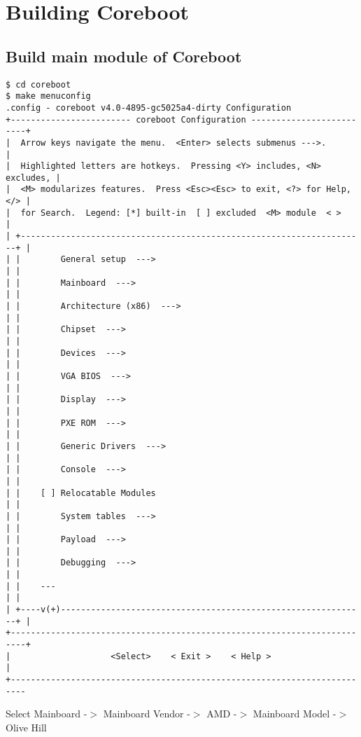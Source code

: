 \documentclass[titlepage,12pt]{article}
\begin{document}
%
%

\section{Building Coreboot}
\subsection{Build main module of Coreboot}
{ \small
\begin{verbatim}
$ cd coreboot
$ make menuconfig
.config - coreboot v4.0-4895-gc5025a4-dirty Configuration
+------------------------ coreboot Configuration -------------------------+
|  Arrow keys navigate the menu.  <Enter> selects submenus --->.          |
|  Highlighted letters are hotkeys.  Pressing <Y> includes, <N> excludes, |
|  <M> modularizes features.  Press <Esc><Esc> to exit, <?> for Help, </> |
|  for Search.  Legend: [*] built-in  [ ] excluded  <M> module  < >       |
| +---------------------------------------------------------------------+ |
| |        General setup  --->                                          | |
| |        Mainboard  --->                                              | |
| |        Architecture (x86)  --->                                     | |
| |        Chipset  --->                                                | |
| |        Devices  --->                                                | |
| |        VGA BIOS  --->                                               | |
| |        Display  --->                                                | |
| |        PXE ROM  --->                                                | |
| |        Generic Drivers  --->                                        | |
| |        Console  --->                                                | |
| |    [ ] Relocatable Modules                                          | |
| |        System tables  --->                                          | |
| |        Payload  --->                                                | |
| |        Debugging  --->                                              | |
| |    ---                                                              | |
| +----v(+)-------------------------------------------------------------+ |
+-------------------------------------------------------------------------+
|                    <Select>    < Exit >    < Help >                     |
+-------------------------------------------------------------------------
\end{verbatim}
}
Select Mainboard -$>$ Mainboard Vendor -$>$ AMD
                 -$>$ Mainboard Model  -$>$ Olive Hill
\end{document}
